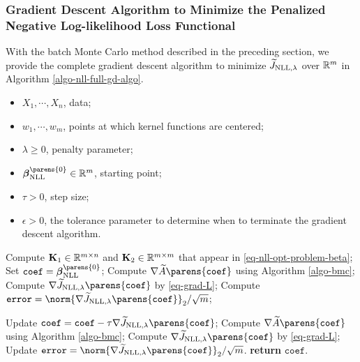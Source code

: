 \subsubsection{Gradient Descent Algorithm to Minimize the Penalized Negative Log-likelihood Loss Functional}

With the batch Monte Carlo method described in the preceding section, we provide the complete gradient descent algorithm to minimize $\widetilde{J}_{\NLL, \lambda}$ over $\mathbb{R}^m$ in Algorithm \ref{algo-nll-full-gd-algo}. 

\begin{algorithm}
\caption{Gradient descent algorithm to minimize $\widetilde{J}_{\NLL, \lambda}$ over $\Real^{m}$}\label{algo-nll-full-gd-algo}
\begin{algorithmic}[1]

\Statex \algorithmicrequire 
\begin{itemize}\setlength\itemsep{0em}
	\item $X_1, \cdots, X_n$, data; 
	\item $w_1, \cdots, w_m$, points at which kernel functions are centered; 
	\item $\lambda \ge 0$, penalty parameter; 
	\item $\bbeta_{\NLL}^{\parens{0}} \in \Real^{m}$, starting point; 
	\item $\tau > 0$, step size; 
	\item $\epsilon > 0$, the tolerance parameter to determine when to terminate the gradient descent algorithm. 
\end{itemize}

\vspace{5pt}

\State Compute $\mathbf{K}_1 \in \mathbb{R}^{m \times n}$ and $\mathbf{K}_2 \in \mathbb{R}^{m \times m}$ that appear in \eqref{eq-nll-opt-problem-beta}; 
\State Set $\mathtt{coef} = \bbeta_{\NLL}^{\parens{0}}$; 
\State Compute $\nabla \widetilde{A} \parens{\mathtt{coef}}$ using Algorithm \ref{algo-bmc}; 
\State Compute $\nabla \widetilde{J}_{\NLL, \lambda} \parens{\mathtt{coef}}$ by \eqref{eq-grad-L}; 
\State Compute $\mathtt{error} = \norm{\nabla \widetilde{J}_{\NLL, \lambda} \parens{ \mathtt{coef} }}_2 / \sqrt{m}$; 

\State Update $\mathtt{coef} = \mathtt{coef} - \tau \nabla \widetilde{J}_{\NLL, \lambda} \parens{\mathtt{coef}}$; 
\State Compute $\nabla \widetilde{A} \parens{\mathtt{coef}}$ using Algorithm \ref{algo-bmc}; 
\State Compute $\nabla \widetilde{J}_{\NLL, \lambda} \parens{\mathtt{coef}}$ by \eqref{eq-grad-L}; 
\State Update $\mathtt{error} = \norm{\nabla \widetilde{J}_{\NLL, \lambda} \parens{\mathtt{coef}}}_2 / \sqrt{m}$. 
\EndWhile
\State \textbf{return} $\mathtt{coef}$. 
\end{algorithmic}
\end{algorithm}


